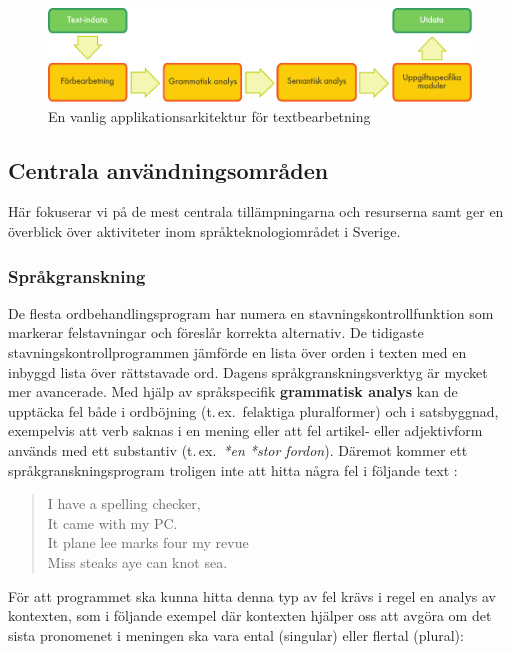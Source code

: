 \begin{multicols}{2}
\begin{figure}[htb]
  \center
  \includegraphics[width=\textwidth]{../_media/swedish/text_processing_app_architecture}
  \caption{En vanlig applikationsarkitektur för textbearbetning}
  \label{fig:textprocessingarch_sv}
\end{figure}

\subsection{Centrala användningsområden} 

Här fokuserar vi på de mest centrala tillämpningarna och resurserna
samt ger en överblick över aktiviteter inom språkteknologiområdet i
Sverige.

\subsubsection{Språkgranskning}

De flesta ordbehandlingsprogram har numera en
stavningskontrollfunktion som markerar felstavningar och föreslår
korrekta alternativ. De tidigaste stavningskontrollprogrammen jämförde
en lista över orden i texten med en inbyggd lista över rättstavade
ord. Dagens språkgranskningsverktyg är mycket mer avancerade. Med
hjälp av språkspecifik \textbf{grammatisk analys} kan de upptäcka fel
både i ordböjning (t.\,ex.~felaktiga pluralformer) och i satsbyggnad,
exempelvis att verb saknas i en mening eller att fel artikel- eller
adjektivform används med ett substantiv (t.\,ex.~\textit{*en *stor
  fordon}). Däremot kommer ett språkgranskningsprogram troligen inte
att hitta några fel i följande text \cite{zar1}:

\begin{quote}
  I have a spelling checker,\\
  It came with my PC.\\
  It plane lee marks four my revue\\
  Miss steaks aye can knot sea.
\end{quote}

För att programmet ska kunna hitta denna typ av fel krävs i regel en
analys av kontexten, som i följande exempel där kontexten hjälper oss
att avgöra om det sista pronomenet i meningen ska vara ental (singular) eller
flertal (plural):


\end{multicols}
